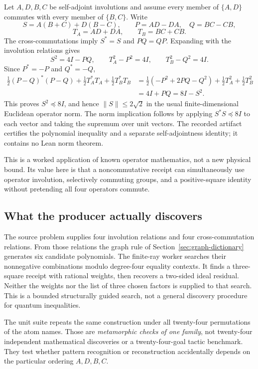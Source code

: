 Let $A,D,B,C$ be self-adjoint involutions and assume every member of $\{A,D\}$
commutes with every member of $\{B,C\}$. Write
\[
 S=A(B+C)+D(B-C),\qquad P=AD-DA,\quad Q=BC-CB,
\]
\[
 T_A=AD+DA,\qquad T_B=BC+CB.
\]
The cross-commutations imply $S^*=S$ and $PQ=QP$. Expanding with the involution
relations gives
\[
 S^2=4I-PQ,\qquad T_A^2-P^2=4I,\qquad T_B^2-Q^2=4I.
\]
Since $P^*=-P$ and $Q^*=-Q$,
\begin{align}
 \tfrac12(P-Q)^*(P-Q)+\tfrac12T_A^*T_A+\tfrac12T_B^*T_B
 &=\tfrac12(-P^2+2PQ-Q^2)+\tfrac12T_A^2+\tfrac12T_B^2\\
 &=4I+PQ=8I-S^2.\label{eq:chsh-sos}
\end{align}
This proves $S^2\preceq8I$, and hence $\|S\|\le2\sqrt2$ in the usual
finite-dimensional Euclidean operator norm. The norm implication follows by
applying $S^*S\preceq8I$ to each vector and taking the supremum over unit
vectors. The recorded artifact certifies the polynomial inequality and a
separate self-adjointness identity; it contains no Lean norm theorem.

This is a worked application of known operator mathematics, not a new physical
bound. Its value here is that a noncommutative receipt can simultaneously use
operator involution, selectively commuting groups, and a positive-square
identity without pretending all four operators commute.

\subsection{What the producer actually discovers}

The source problem supplies four involution relations and four cross-commutation
relations. From those relations the graph rule of
Section~\ref{sec:graph-dictionary} generates six candidate polynomials. The
finite-ray worker searches their nonnegative combinations modulo degree-four
equality contexts. It finds a three-square receipt with rational weights, then
recovers a two-sided ideal residual. Neither the weights nor the list of three
chosen factors is supplied to that search. This is a bounded structurally guided
search, not a general discovery procedure for quantum inequalities.

The unit suite repeats the same construction under all twenty-four permutations
of the atom names. Those are \emph{metamorphic checks of one family}, not
twenty-four independent mathematical discoveries or a twenty-four-goal tactic
benchmark. They test whether pattern recognition or reconstruction accidentally
depends on the particular ordering $A,D,B,C$.

